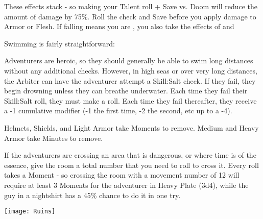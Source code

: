 {  These effects stack - so making your Talent roll + Save vs. Doom will reduce the amount of damage by 75\%.  Roll the check and Save before you apply damage to Armor or Flesh.  If falling means you are , you also take the effects of  and 




Swimming is fairly straightforward:


Adventurers are heroic, so they should generally be able to swim long distances without any additional checks.  However, in high seas or over very long distances, the Arbiter can have the adventurer attempt a Skill:Salt check.  If they fail, they begin drowning unless they can breathe underwater.  Each time they fail their Skill:Salt roll, they must make a \DEATH roll.  Each time they fail thereafter, they receive a -1 cumulative modifier (-1 the first time, -2 the second, etc up to a -4).  


  Helmets, Shields, and Light Armor take Moments to remove.  Medium and Heavy Armor take Minutes to remove.

\cbreak



  If the adventurers are crossing an area that is dangerous, or where time is of the essence, give the room a total number that you need to roll to cross it.  Every \MD roll takes a Moment - so crossing the room with a movement number of 12 will require at least 3 Moments for the adventurer in Heavy Plate (3d4), while the guy in a nightshirt has a 45\% chance to do it in one try.


  \begin{center}
  \texttt{[image: Ruins]}
  \end{center}

}

